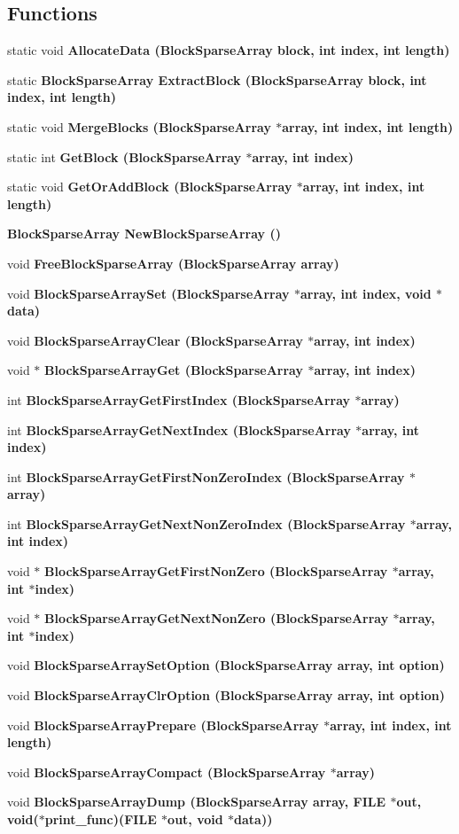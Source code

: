 \subsection*{Functions}
\begin{CompactItemize}
\item 
static void \bf{Allocate\-Data} (\bf{Block\-Sparse\-Array} block, int index, int length)
\item 
static \bf{Block\-Sparse\-Array} \bf{Extract\-Block} (\bf{Block\-Sparse\-Array} block, int index, int length)
\item 
static void \bf{Merge\-Blocks} (\bf{Block\-Sparse\-Array} $\ast$array, int index, int length)
\item 
static int \bf{Get\-Block} (\bf{Block\-Sparse\-Array} $\ast$array, int index)
\item 
static void \bf{Get\-Or\-Add\-Block} (\bf{Block\-Sparse\-Array} $\ast$array, int index, int length)
\item 
\bf{Block\-Sparse\-Array} \bf{New\-Block\-Sparse\-Array} ()
\item 
void \bf{Free\-Block\-Sparse\-Array} (\bf{Block\-Sparse\-Array} array)
\item 
void \bf{Block\-Sparse\-Array\-Set} (\bf{Block\-Sparse\-Array} $\ast$array, int index, void $\ast$data)
\item 
void \bf{Block\-Sparse\-Array\-Clear} (\bf{Block\-Sparse\-Array} $\ast$array, int index)
\item 
void $\ast$ \bf{Block\-Sparse\-Array\-Get} (\bf{Block\-Sparse\-Array} $\ast$array, int index)
\item 
int \bf{Block\-Sparse\-Array\-Get\-First\-Index} (\bf{Block\-Sparse\-Array} $\ast$array)
\item 
int \bf{Block\-Sparse\-Array\-Get\-Next\-Index} (\bf{Block\-Sparse\-Array} $\ast$array, int index)
\item 
int \bf{Block\-Sparse\-Array\-Get\-First\-Non\-Zero\-Index} (\bf{Block\-Sparse\-Array} $\ast$array)
\item 
int \bf{Block\-Sparse\-Array\-Get\-Next\-Non\-Zero\-Index} (\bf{Block\-Sparse\-Array} $\ast$array, int index)
\item 
void $\ast$ \bf{Block\-Sparse\-Array\-Get\-First\-Non\-Zero} (\bf{Block\-Sparse\-Array} $\ast$array, int $\ast$index)
\item 
void $\ast$ \bf{Block\-Sparse\-Array\-Get\-Next\-Non\-Zero} (\bf{Block\-Sparse\-Array} $\ast$array, int $\ast$index)
\item 
void \bf{Block\-Sparse\-Array\-Set\-Option} (\bf{Block\-Sparse\-Array} array, int option)
\item 
void \bf{Block\-Sparse\-Array\-Clr\-Option} (\bf{Block\-Sparse\-Array} array, int option)
\item 
void \bf{Block\-Sparse\-Array\-Prepare} (\bf{Block\-Sparse\-Array} $\ast$array, int index, int length)
\item 
void \bf{Block\-Sparse\-Array\-Compact} (\bf{Block\-Sparse\-Array} $\ast$array)
\item 
void \bf{Block\-Sparse\-Array\-Dump} (\bf{Block\-Sparse\-Array} array, FILE $\ast$out, void($\ast$print\_\-func)(FILE $\ast$out, void $\ast$data))
\end{CompactItemize}


